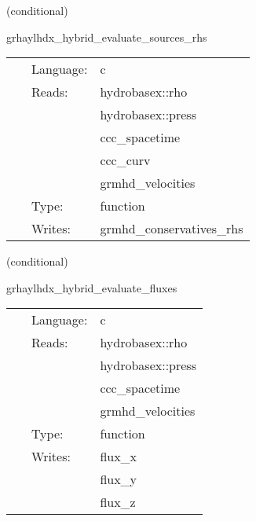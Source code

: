    (conditional) 

\hspace{5mm} grhaylhdx\_hybrid\_evaluate\_sources\_rhs 

\hspace{5mm}{\it hybrid version of grhaylhdx\_evaluate\_sources\_rhs } 


\hspace{5mm}

 \begin{tabular*}{160mm}{cll} 
~ & Language:  & c \\ 
~ & Reads:  & hydrobasex::rho \\ 
~& ~ &hydrobasex::press\\ 
~& ~ &ccc\_spacetime\\ 
~& ~ &ccc\_curv\\ 
~& ~ &grmhd\_velocities\\ 
~ & Type:  & function \\ 
~ & Writes:  & grmhd\_conservatives\_rhs \\ 
\end{tabular*} 


\vspace{5mm}

   (conditional) 

\hspace{5mm} grhaylhdx\_hybrid\_evaluate\_fluxes 

\hspace{5mm}{\it hybrid version of grhaylhdx\_evaluate\_fluxes } 


\hspace{5mm}

 \begin{tabular*}{160mm}{cll} 
~ & Language:  & c \\ 
~ & Reads:  & hydrobasex::rho \\ 
~& ~ &hydrobasex::press\\ 
~& ~ &ccc\_spacetime\\ 
~& ~ &grmhd\_velocities\\ 
~ & Type:  & function \\ 
~ & Writes:  & flux\_x \\ 
~& ~ &flux\_y\\ 
~& ~ &flux\_z\\ 
\end{tabular*} 


\vspace{5mm}

